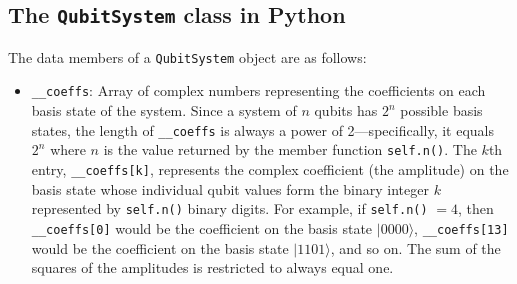 \documentclass{article}
\begin{document}
\subsection{The \texttt{QubitSystem} class in Python}

The data members of a \verb~QubitSystem~ object are as follows: 
\begin{itemize}
\item \verb~__coeffs~: Array of complex numbers representing the coefficients on each basis state of the system. Since a system of $n$ qubits has $2^n$ possible basis states, the length of \verb~__coeffs~ is always a power of 2---specifically, it equals $2^n$ where $n$ is the value returned by the member function \verb~self.n()~. The $k$th entry, \verb~__coeffs[k]~, represents the complex coefficient (the amplitude) on the basis state whose individual qubit values form the binary integer $k$ represented by \verb~self.n()~ binary digits. For example, if \verb~self.n()~ $= 4$, then \verb~__coeffs[0]~ would be the coefficient on the basis state $|0000\rangle$, \verb~__coeffs[13]~ would be the coefficient on the basis state $|1101\rangle$, and so on. The sum of the squares of the amplitudes is restricted to always equal one. 
\end{itemize}
\end{document}

